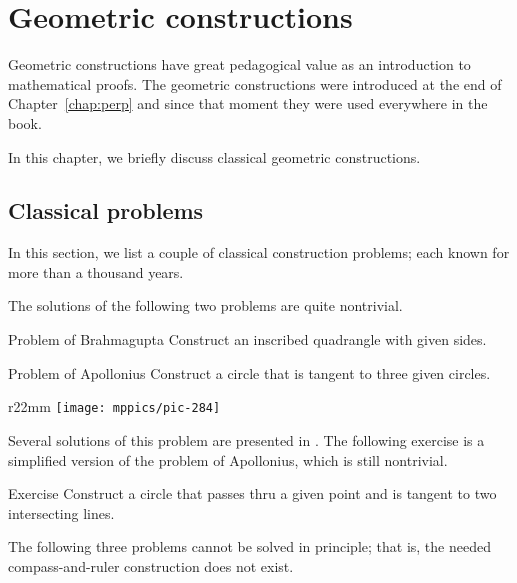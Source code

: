 \chapter{Geometric constructions}
\label{chap:car}

Geometric constructions have great pedagogical value 
as an introduction to mathematical proofs.
The geometric constructions were introduced at the end of Chapter~\ref{chap:perp}
and since that moment they were used everywhere in the book.

In this chapter, we briefly discuss classical geometric constructions.

%
%

\section{Classical problems}

In this section, we list a couple of classical construction problems;
each known for more than a thousand years. 

The solutions of the following two problems are quite nontrivial.

\begin{thm}{Problem of Brahmagupta} 
Construct an inscribed quadrangle with given sides.
\end{thm}


 
\begin{thm}{Problem of Apollonius} Construct a circle that is tangent to three given circles.
\end{thm}

{

\begin{wrapfigure}{r}{22mm}
\vskip-10mm
\centering
\texttt{[image: mppics/pic-284]}
\end{wrapfigure}

Several solutions of this problem are presented in \cite{hadamard}. 
The following exercise is a simplified version of the problem of Apollonius, which is still nontrivial.

\begin{thm}{Exercise}\label{ex:simple-apollonius}
Construct a circle that passes thru a given point and is tangent to two intersecting lines.
\end{thm}

}


The following three problems cannot be solved in principle; 
that is, the needed compass-and-ruler construction does not exist.

